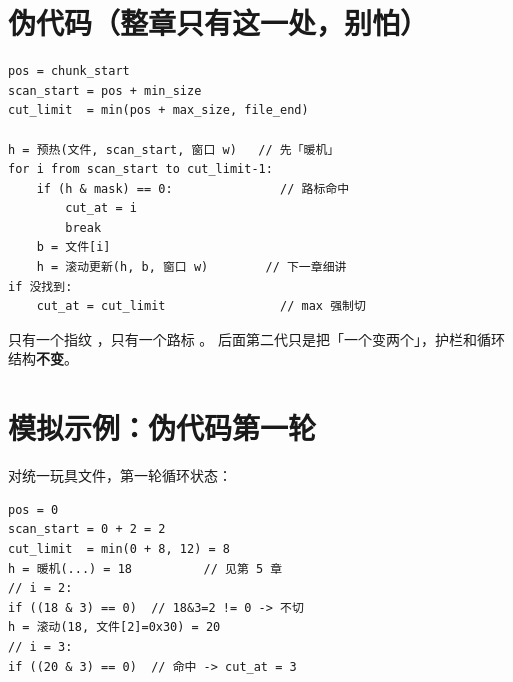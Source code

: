 \section{伪代码（整章只有这一处，别怕）}

\begin{codebox}
\begin{lstlisting}
pos = chunk_start
scan_start = pos + min_size
cut_limit  = min(pos + max_size, file_end)

h = 预热(文件, scan_start, 窗口 w)   // 先「暖机」
for i from scan_start to cut_limit-1:
    if (h & mask) == 0:               // 路标命中
        cut_at = i
        break
    b = 文件[i]
    h = 滚动更新(h, b, 窗口 w)        // 下一章细讲
if 没找到:
    cut_at = cut_limit                // max 强制切
\end{lstlisting}
\end{codebox}

\begin{stepbox}
只有一个指纹 ，只有一个路标 。  
后面第二代只是把「一个变两个」，护栏和循环结构\textbf{不变}。

\end{stepbox}

\section{模拟示例：伪代码第一轮}

对统一玩具文件，第一轮循环状态：

\begin{simbox}[骨架代码代入数值]
\begin{lstlisting}
pos = 0
scan_start = 0 + 2 = 2
cut_limit  = min(0 + 8, 12) = 8
h = 暖机(...) = 18          // 见第 5 章
// i = 2:
if ((18 & 3) == 0)  // 18&3=2 != 0 -> 不切
h = 滚动(18, 文件[2]=0x30) = 20
// i = 3:
if ((20 & 3) == 0)  // 命中 -> cut_at = 3
\end{lstlisting}
\end{simbox}
